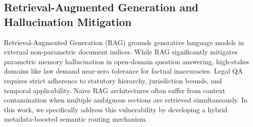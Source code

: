 \documentclass{llncs}
\begin{document}
\subsection{Retrieval-Augmented Generation and Hallucination Mitigation}
Retrieval-Augmented Generation (RAG) \cite{lewis2020rag} grounds generative language models in external non-parametric document indices. While RAG significantly mitigates parametric memory hallucination in open-domain question answering, high-stakes domains like law demand near-zero tolerance for factual inaccuracies. Legal QA requires strict adherence to statutory hierarchy, jurisdiction bounds, and temporal applicability. Naive RAG architectures often suffer from context contamination when multiple ambiguous sections are retrieved simultaneously. In this work, we specifically address this vulnerability by developing a hybrid metadata-boosted semantic routing mechanism.
\end{document}
